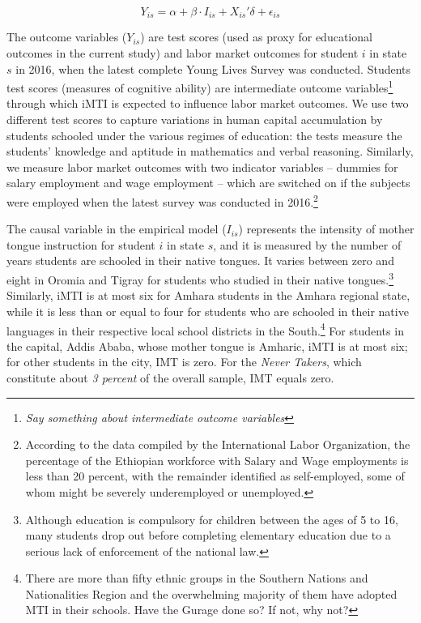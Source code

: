 \begin{equation}\label{eq:01}
	Y_{is} = \alpha + \beta\cdot I_{is} + X_{is}'\delta + \epsilon_{is}
\end{equation}

The outcome variables ($ Y_{is} $) are test scores (used as proxy for educational outcomes in the current study) and labor market outcomes for student $ i $ in state $ s $ in 2016, when the latest complete Young Lives Survey was conducted. Students test scores (measures of cognitive ability) are intermediate outcome variables\footnote{\textit{Say something about intermediate outcome variables}} through which iMTI is expected to influence labor market outcomes. We use two different test scores to capture variations in human capital accumulation by students schooled under the various regimes of education: the tests measure the students’ knowledge and aptitude in mathematics and verbal reasoning. Similarly, we measure labor market outcomes with two indicator variables – dummies for salary employment and wage employment – which are switched on if the subjects were employed when the latest survey was conducted in 2016.\footnote{According to the data compiled by the International Labor Organization, the percentage of the Ethiopian workforce with Salary and Wage employments is less than 20 percent, with the remainder identified as self-employed, some of whom might be severely underemployed or unemployed.}  

The causal variable in the empirical model ($ I_{is} $) represents the intensity of mother tongue instruction for student $ i $ in state $ s $, and it is measured by the number of years students are schooled in their native tongues. It varies between zero and eight in Oromia and Tigray for students who studied in their native tongues.\footnote{Although education is compulsory for children between the ages of 5 to 16, many students drop out before completing elementary education due to a serious lack of enforcement of the national law.} Similarly, iMTI is at most six for Amhara students in the Amhara regional state, while it is less than or equal to four for students who are schooled in their native languages in their respective local school districts in the South.\footnote{There are more than fifty ethnic groups in the Southern Nations and Nationalities Region and the overwhelming majority of them have adopted MTI in their schools. Have the Gurage done so? If not, why not?} For students in the capital, Addis Ababa, whose mother tongue is Amharic, iMTI is at most six; for other students in the city, IMT is zero. For the \textit{Never Takers}, which constitute about \textit{3 percent} of the overall sample, IMT equals zero. 

